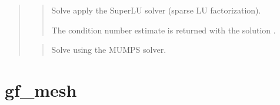\documentclass[a4paper,11pt,english]{sphinxmanual}
\begin{document}
\begin{quote}
\begin{quote}

Solve  apply the SuperLU solver (sparse LU factorization).

The condition number estimate  is returned with the solution .
\end{quote}

\begin{quote}

Solve  using the MUMPS solver.
\end{quote}
\end{quote}


\section{gf\_mesh}
\label{\detokenize{matlab_octave/cmdref_gf_mesh:gf-mesh}}\label{\detokenize{matlab_octave/cmdref_gf_mesh::doc}}
\end{document}

